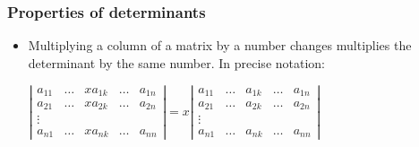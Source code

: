 \begin{frame}
\frametitle{Properties of determinants}
\begin{itemize}
\item Multiplying a column of a matrix by a number changes multiplies the determinant by the same number. In precise notation:
\begin{lemma}
$\left|\begin{array}{ccccc}
a_{11} &   \dots & x a_{1k} & \dots & a_{1n}\\
a_{21} &   \dots & x a_{2k} & \dots & a_{2n}\\
\vdots \\
a_{n1} &   \dots & x a_{nk} & \dots & a_{nn}
\end{array} \right| = 
x \left|\begin{array}{ccccc}
a_{11} &   \dots & a_{1k} & \dots & a_{1n}\\
a_{21} &   \dots & a_{2k} & \dots & a_{2n}\\
\vdots \\
a_{n1} &   \dots & a_{nk} & \dots & a_{nn}
\end{array} \right| $
\end{lemma}

\end{itemize}
\end{frame}
